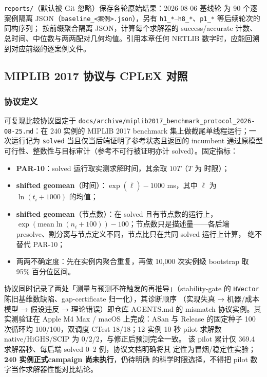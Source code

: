 \texttt{reports/}（默认被 Git 忽略）保存各轮原始结果：2026-08-06 基线轮
为 90 个逐案例隔离 JSON（\texttt{baseline\_<案例>.json}），另有
\texttt{h1\_*}--\texttt{h8\_*}、\texttt{p1\_*} 等后续轮次的同构序列；
 按前缀聚合隔离 JSON，计算每个求解器的
success/accurate 计数、总时间、中位数与两两配对几何均值。引用本章任何
NETLIB 数字时，应能回溯到对应前缀的逐案例文件。

\subsection{MIPLIB 2017 协议与 CPLEX 对照}
\label{sec:engine-nv-miplib}

\subsubsection{协议定义}

可复现比较协议固定于
\texttt{docs/archive/miplib2017\_benchmark\_protocol\_2026-08-25.md}：在
240 实例的 MIPLIB 2017 benchmark 集上做截尾单线程运行；一次运行记为
\texttt{solved} 当且仅当后端证明了参考状态且返回的 incumbent 通过原模型
可行性、整数性与目标审计（参考不可行被证明亦计 solved）。固定指标：

\begin{itemize}
  \item \textbf{PAR-10}：solved 运行取实测求解时间，其余取 $10T$（$T$ 为
        时限）；
  \item \textbf{shifted geomean}（时间）：$\exp(\bar{\ell})-1000$ ms，其中
        $\bar{\ell}$ 为 $\ln(t_i+1000)$ 的均值；
  \item \textbf{shifted geomean}（节点数）：在 solved 且有节点数的运行上，
        $\exp(\mathrm{mean}\ln(n_i+100))-100$；节点数只是描述量——各后端
        presolve、割分离与节点定义不同，节点比只在共同 solved 运行上计算，
        绝不替代 PAR-10；
  \item 两两不确定度：先在实例内聚合重复，再做 10{,}000 次实例级
        bootstrap 取 95\% 百分位区间。
\end{itemize}

协议同时记录了两处「测量与预测不符触发的再推导」（stability-gate 的
\texttt{HVector} 陈旧基维数缺陷、gap-certificate 归一化），其诊断顺序
（实现失真 → 机器/成本模型 → 假设违反 → 理论错误）即仓库 AGENTS.md 的
mismatch 协议实例。其实测验证在 Apple M4 Max / macOS 上完成：ASan 与
Release 的固定种子 100 次循环均 100/100，双调度 CTest 18/18；12 实例
10 秒 pilot 求解数 native/HiGHS/SCIP 为 0/2/2，与修正后预测完全一致。
该 pilot 累计仅 369.4 求解器秒、每后端 solved 0--2 例，协议文档明确将其
定性为冒烟/稳定性实验；\textbf{240 实例正式campaign 尚未执行}，仍待明确
的科学时限选择，不得把 pilot 数字当作求解器性能对比结论。

